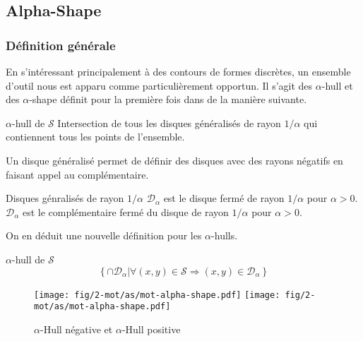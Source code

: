 \subsection{Alpha-Shape}

\subsubsection{Définition générale}

En s'intéressant principalement à des contours de formes discrètes, un ensemble d'outil nous est apparu comme particulièrement opportun. Il s'agit des $\alpha$-hull et des $\alpha$-shape définit pour la première fois dans \cite{EdeKirSei83} de la manière suivante.\\

\begin{Definition}{$\alpha$-hull de $\mathcal{S}$}
\label{def:ah-txt}
    Intersection de tous les disques généralisés de rayon $1/\alpha$ qui contiennent tous les points de l'ensemble.
\end{Definition}

Un disque généralisé permet de définir des disques avec des rayons négatifs en faisant appel au complémentaire.

\begin{Definition}{Disques génralisés de rayon $1/\alpha$}
\label{def:dis-gen}
   $\mathcal{D}_{\alpha}$ est le disque fermé de rayon $1/\alpha$ pour $\alpha > 0$.\\
   $\mathcal{D}_{\alpha}$ est le complémentaire fermé du disque de rayon $1/\alpha$ pour $\alpha > 0$.
\end{Definition}

On en déduit une nouvelle définition pour les $\alpha$-hulls.

\begin{Definition}{$\alpha$-hull de $\mathcal{S}$}
\label{def:ah}
    $$\left\{ \cap \mathcal{D}_{\alpha} | \forall (x,y)\in \mathcal{S} \Rightarrow (x,y) \in \mathcal{D}_{\alpha} \right\}$$
\end{Definition}

\begin{figure}[h!]
  \centering
  \texttt{[image: fig/2-mot/as/mot-alpha-shape.pdf]}
  \texttt{[image: fig/2-mot/as/mot-alpha-shape.pdf]}
  \caption{$\alpha$-Hull négative et $\alpha$-Hull positive }
\end{figure}
  

